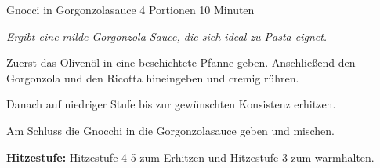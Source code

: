 \begin{recipe}{Gnocci in Gorgonzolasauce} {4 Portionen} {10 Minuten}

  \freeform
  \textit{Ergibt eine milde Gorgonzola Sauce, die sich ideal zu Pasta eignet.}
  
  
  Zuerst das Olivenöl in eine beschichtete Pfanne geben.
  Anschließend den Gorgonzola und den Ricotta hineingeben und cremig rühren.

  \newstep
  Danach auf niedriger Stufe bis zur gewünschten Konsistenz erhitzen.

  Am Schluss die Gnocchi in die Gorgonzolasauce geben und mischen.
  
  \freeform
  \hrulefill
  
  \freeform
  \textbf{Hitzestufe:}
  Hitzestufe 4-5 zum Erhitzen und Hitzestufe 3 zum warmhalten.
  
  \end{recipe}
  
